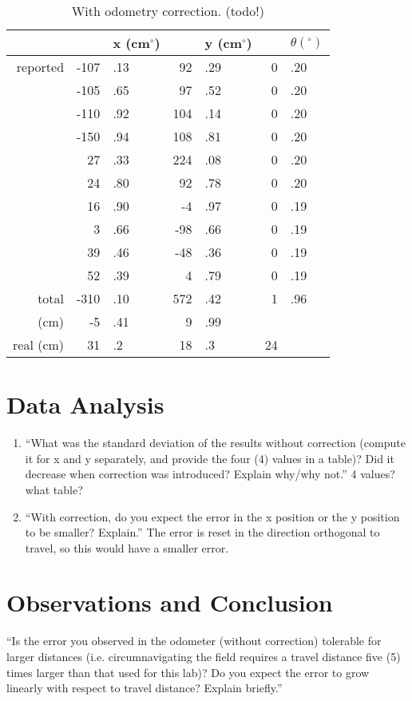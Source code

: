 \documentclass[twocolumn]{article}
\def\degree{\ensuremath{^\circ}}
\begin{document}
\begin{table}[htb]
\begin{center}\begin{tabular}{r r@{}l r@{}l r@{}l}
& &x (cm\degree)& &y (cm\degree)& &$\theta (\degree)$ \\
\hline
reported&-107&.13&	92&.29&	0&.20 \\
&-105&.65&	97&.52&	0&.20 \\
&-110&.92&	104&.14&	0&.20 \\
&-150&.94&	108&.81&	0&.20 \\
&27&.33&	224&.08&	0&.20 \\
&24&.80&	92&.78&	0&.20 \\
&16&.90&	-4&.97&	0&.19 \\
&3&.66&	-98&.66&	0&.19 \\
&39&.46&	-48&.36&	0&.19 \\
&52&.39&	4&.79&	0&.19 \\
\hline
total&	-310&.10&	572&.42&	1&.96 \\
(cm)&	-5&.41& 9&.99\\
real (cm)&	31&.2&	18&.3&	24
\end{tabular}\end{center}
\caption{With odometry correction. (todo!)}
\label{b}
\end{table}

\section{Data Analysis}

\begin{enumerate}
\item ``What was the standard deviation of the results without correction (compute it for x and y separately, and provide the four (4) values in a table)? Did it decrease when correction was introduced? Explain why/why not.\cite{lab2}'' 4 values? what table?
\item ``With correction, do you expect the error in the x position or the y position to be smaller? Explain.'' The error is reset in the direction orthogonal to travel, so this would have a smaller error.
\end{enumerate}

\section{Observations and Conclusion}

``Is the error you observed in the odometer (without correction) tolerable for larger distances (i.e. circumnavigating the field requires a travel distance five (5) times larger than that used for this lab)? Do you expect the error to grow linearly with respect to travel distance? Explain briefly.\cite{lab2}''
\end{document}
